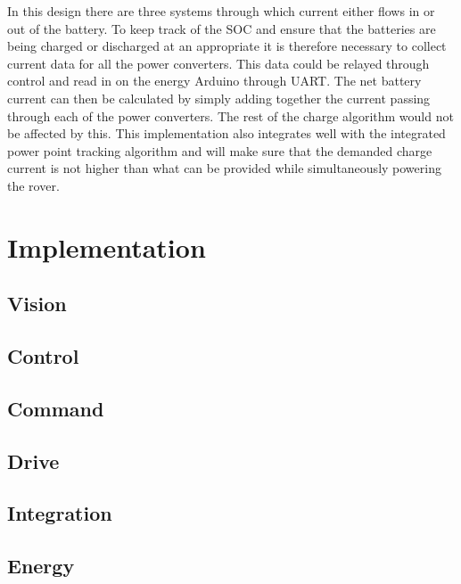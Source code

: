 \documentclass[a4paper]{article}
\begin{document}
In this design there are three systems through which current either flows in or 
out of the battery. To keep track of the SOC and ensure that the batteries are 
being charged or discharged at an appropriate it is therefore necessary to collect
current data for all the power converters. This data could be relayed through control 
and read in on the energy Arduino through UART. The net battery current can then be 
calculated by simply adding together the current passing through each of the power 
converters. The rest of the charge algorithm would not be affected by this. This 
implementation also integrates well with the integrated power point tracking algorithm 
and will make sure that the demanded charge current is not higher than what can be 
provided while simultaneously powering the rover.



\section{Implementation}

\subsection{Vision}

\subsection{Control}

\subsection{Command}

\subsection{Drive}

\subsection{Integration}


\subsection{Energy}
\end{document}
